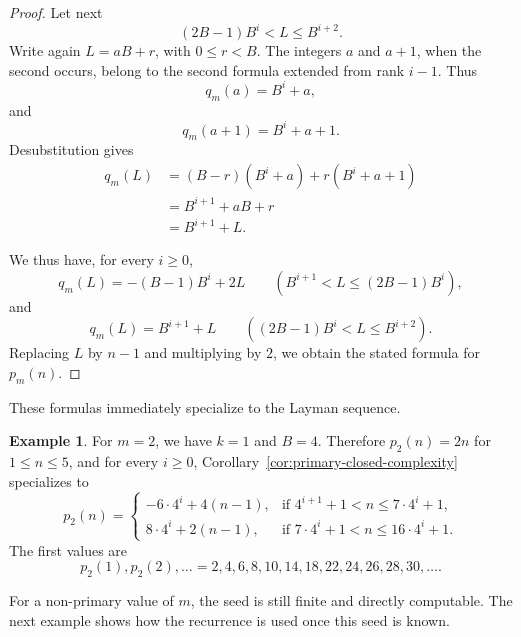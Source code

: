 \documentclass[12pt,reqno]{article}
\theoremstyle{plain}
\theoremstyle{definition}
\newtheorem{example}[theorem]{Example}
\begin{document}
\begin{proof}
Let next
\[
  (2B - 1) B^i < L \le B^{i+2}.
\]
Write again $L = aB + r$, with $0 \le r < B$. The integers $a$ and $a + 1$, when the second occurs, belong to the second formula extended from rank $i - 1$. Thus
\[
  q_m(a) = B^i + a,
\]
and
\[
  q_m(a + 1) = B^i + a + 1.
\]
Desubstitution gives
\[
\begin{aligned}
  q_m(L) &= (B - r)(B^i + a) + r(B^i + a + 1) \\
         &= B^{i+1} + aB + r \\
         &= B^{i+1} + L.
\end{aligned}
\]

We thus have, for every $i \ge 0$,
\[
  q_m(L) = -(B - 1) B^i + 2L \qquad (B^{i+1} < L \le (2B - 1) B^i),
\]
and
\[
  q_m(L) = B^{i+1} + L \qquad ((2B - 1) B^i < L \le B^{i+2}).
\]
Replacing $L$ by $n - 1$ and multiplying by $2$, we obtain the stated formula for $p_m(n)$.
\end{proof}

These formulas immediately specialize to the Layman sequence.

\begin{example}
\label{ex:complexity-a2}
For $m = 2$, we have $k = 1$ and $B = 4$. Therefore $p_2(n) = 2n$ for $1 \le n \le 5$, and for every $i \ge 0$, Corollary~\ref{cor:primary-closed-complexity} specializes to
\[
  p_2(n) =
  \begin{cases}
    -6 \cdot 4^i + 4(n-1),
       & \text{if } 4^{i+1}+1 < n \le 7 \cdot 4^i + 1,\\[2mm]
    8 \cdot 4^i + 2(n-1),
       & \text{if } 7 \cdot 4^i + 1 < n \le 16 \cdot 4^i + 1.
  \end{cases}
\]
The first values are
\[
  p_2(1), p_2(2), \ldots = 2, 4, 6, 8, 10, 14, 18, 22, 24, 26, 28, 30, \ldots.
\]
\end{example}

For a non-primary value of \(m\), the seed is still finite and directly
computable. The next example shows how the recurrence is used once this
seed is known.
\end{document}
